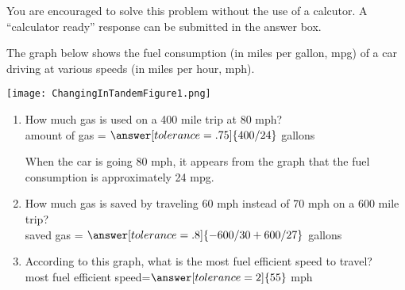 \documentclass{ximera}
\author{Elizabeth Miller}
\begin{document}
\licenseAPC
You are encouraged to solve this problem without the use of a calcutor. A ``calculator ready'' response can be submitted in the answer box.
\begin{exercise}
The graph below shows the fuel consumption (in miles per gallon, mpg) of a car driving at various speeds (in miles per hour, mph).

\begin{image}
\texttt{[image: ChangingInTandemFigure1.png]}
\end{image}

\begin{enumerate}
\item How much gas is used on a 400 mile trip at 80 mph?  \\
amount of gas = $\answer[tolerance=.75]{400/24}$ gallons

\begin{hint}
When the car is going 80 mph, it appears from the graph that the fuel consumption is approximately 24 mpg.
\end{hint}

\item How much gas is saved by traveling 60 mph instead of 70 mph on a 600 mile trip?  \\
saved gas = $\answer[tolerance=.8]{-600/30+600/27}$ gallons

\item According to this graph, what is the most fuel efficient speed to travel? \\
most fuel efficient speed=$\answer[tolerance=2]{55}$ mph

\end{enumerate}



\end{exercise}
\end{document}
